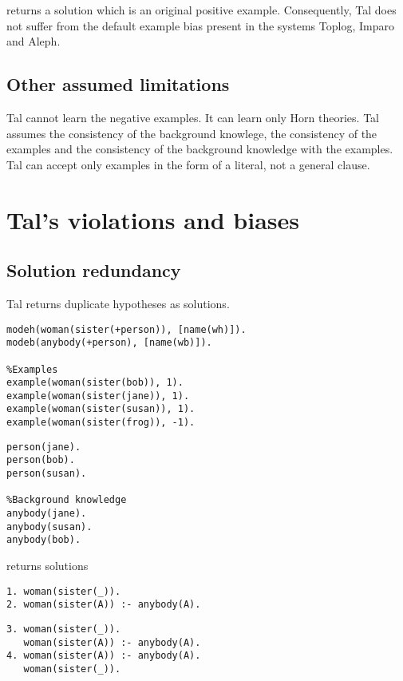 returns a solution  which is an original positive example. Consequently, Tal does not suffer from the default example bias present in the systems Toplog, Imparo and Aleph.

\subsection{Other assumed limitations}
Tal cannot learn the negative examples. It can learn only Horn theories. Tal assumes the consistency of the background knowlege, the consistency of the examples and the consistency of the background knowledge with the examples. Tal can accept only examples in the form of a literal, not a general clause.

\section{Tal's violations and biases}

\subsection{Solution redundancy}\label{tal_solution_redundancy}
Tal returns duplicate hypotheses as solutions.

\begin{minipage}[t]{.65\textwidth}
\begin{lstlisting}
modeh(woman(sister(+person)), [name(wh)]).
modeb(anybody(+person), [name(wb)]).

%Examples
example(woman(sister(bob)), 1).
example(woman(sister(jane)), 1).
example(woman(sister(susan)), 1).
example(woman(sister(frog)), -1).
\end{lstlisting}
\end{minipage}
\begin{minipage}[t]{.20\textwidth}
\begin{lstlisting}
person(jane).
person(bob).
person(susan).

%Background knowledge
anybody(jane).
anybody(susan).
anybody(bob).
\end{lstlisting}
\end{minipage}

returns solutions

\begin{minipage}[t]{.50\textwidth}
\begin{lstlisting}
1. woman(sister(_)).
2. woman(sister(A)) :- anybody(A).
\end{lstlisting}
\end{minipage}
\begin{minipage}[t]{.20\textwidth}
\begin{lstlisting}
3. woman(sister(_)).
   woman(sister(A)) :- anybody(A).
4. woman(sister(A)) :- anybody(A).
   woman(sister(_)).
\end{lstlisting}
\end{minipage}

